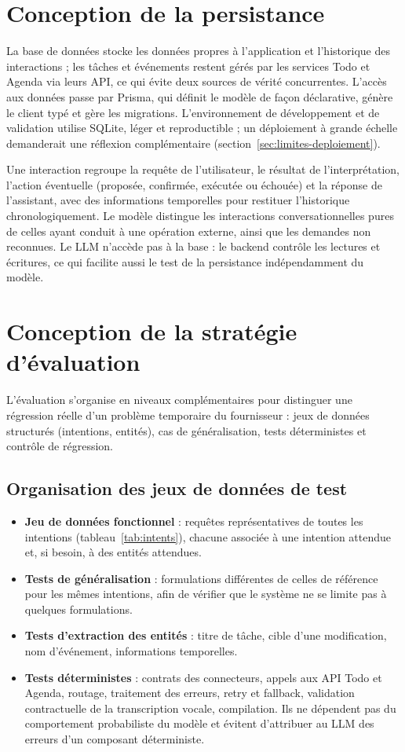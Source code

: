 \documentclass[11pt,a4paper,openany,oneside]{report}
\begin{document}
\section{Conception de la persistance}
La base de données stocke les données propres à l'application et l'historique des interactions ; les tâches et événements restent gérés par les services Todo et Agenda via leurs API, ce qui évite deux sources de vérité concurrentes. L'accès aux données passe par Prisma, qui définit le modèle de façon déclarative, génère le client typé et gère les migrations. L'environnement de développement et de validation utilise SQLite, léger et reproductible ; un déploiement à grande échelle demanderait une réflexion complémentaire (section~\ref{sec:limites-deploiement}).

Une interaction regroupe la requête de l'utilisateur, le résultat de l'interprétation, l'action éventuelle (proposée, confirmée, exécutée ou échouée) et la réponse de l'assistant, avec des informations temporelles pour restituer l'historique chronologiquement. Le modèle distingue les interactions conversationnelles pures de celles ayant conduit à une opération externe, ainsi que les demandes non reconnues. Le LLM n'accède pas à la base : le backend contrôle les lectures et écritures, ce qui facilite aussi le test de la persistance indépendamment du modèle.

\section{Conception de la stratégie d'évaluation}\label{sec:strategie-eval}
L'évaluation s'organise en niveaux complémentaires pour distinguer une régression réelle d'un problème temporaire du fournisseur : jeux de données structurés (intentions, entités), cas de généralisation, tests déterministes et contrôle de régression.

\subsection{Organisation des jeux de données de test}
\begin{itemize}
\item \textbf{Jeu de données fonctionnel} : requêtes représentatives de toutes les intentions (tableau~\ref{tab:intents}), chacune associée à une intention attendue et, si besoin, à des entités attendues.
\item \textbf{Tests de généralisation} : formulations différentes de celles de référence pour les mêmes intentions, afin de vérifier que le système ne se limite pas à quelques formulations.
\item \textbf{Tests d'extraction des entités} : titre de tâche, cible d'une modification, nom d'événement, informations temporelles.
\item \textbf{Tests déterministes} : contrats des connecteurs, appels aux API Todo et Agenda, routage, traitement des erreurs, retry et fallback, validation contractuelle de la transcription vocale, compilation. Ils ne dépendent pas du comportement probabiliste du modèle et évitent d'attribuer au LLM des erreurs d'un composant déterministe.
\end{itemize}
\end{document}
